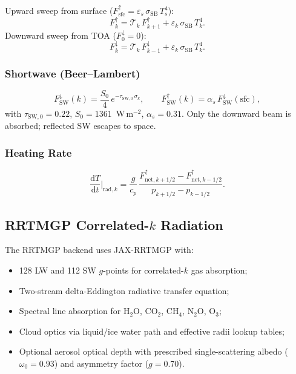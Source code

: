 \documentclass[11pt,twoside]{report}
\newcommand{\dd}{\mathrm{d}}
\newcommand{\cpd}{c_p}
\newcommand{\SB}{\sigma_{\mathrm{SB}}}
\begin{document}
Upward sweep from surface ($F^\uparrow_{\mathrm{sfc}}=\varepsilon_s\,\SB\,T_s^4$):
\begin{equation}
  F^\uparrow_k = \mathcal{T}_k\,F^\uparrow_{k+1} + \varepsilon_k\,\SB\,T_k^4.
\end{equation}
Downward sweep from TOA ($F^\downarrow_0=0$):
\begin{equation}
  F^\downarrow_k = \mathcal{T}_k\,F^\downarrow_{k-1} + \varepsilon_k\,\SB\,T_k^4.
\end{equation}

\subsubsection{Shortwave (Beer--Lambert)}
\begin{equation}
  F^\downarrow_{\mathrm{SW}}(k) = \frac{S_0}{4}\,
  e^{-\tau_{\mathrm{SW},0}\,\sigma_k},
  \qquad
  F^\uparrow_{\mathrm{SW}}(k) = \alpha_s\,F^\downarrow_{\mathrm{SW}}(\mathrm{sfc}),
\end{equation}
with $\tau_{\mathrm{SW},0}=0.22$, $S_0=1361$~W\,m$^{-2}$, $\alpha_s=0.31$.
Only the downward beam is absorbed; reflected SW escapes to space.

\subsubsection{Heating Rate}
\begin{equation}
  \frac{\dd T}{\dd t}\bigg|_{\mathrm{rad},k}
  = \frac{g}{\cpd}\,
  \frac{F^{\uparrow}_{\mathrm{net},k+1/2}-F^{\uparrow}_{\mathrm{net},k-1/2}}
  {p_{k+1/2}-p_{k-1/2}}.
\end{equation}

\subsection{RRTMGP Correlated-$k$ Radiation}
\label{sec:rrtmgp}

The RRTMGP backend uses JAX-RRTMGP with:
\begin{itemize}[nosep]
  \item 128 LW and 112 SW $g$-points for correlated-$k$ gas absorption;
  \item Two-stream delta-Eddington radiative transfer equation;
  \item Spectral line absorption for H$_2$O, CO$_2$, CH$_4$, N$_2$O, O$_3$;
  \item Cloud optics via liquid/ice water path and effective radii lookup
    tables;
  \item Optional aerosol optical depth with prescribed single-scattering
    albedo ($\omega_0=0.93$) and asymmetry factor ($g=0.70$).
\end{itemize}
\end{document}
